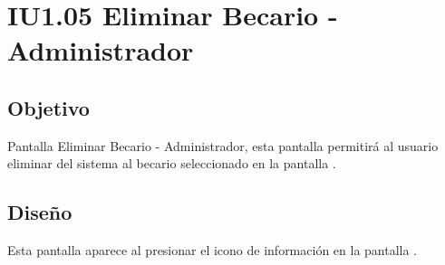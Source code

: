 \newpage
\section{IU1.05 Eliminar Becario - Administrador}

\subsection{Objetivo}
	Pantalla  Eliminar Becario - Administrador, esta pantalla permitirá al usuario  eliminar del sistema al becario seleccionado en la pantalla  .
	
	


\subsection{Diseño}
    Esta pantalla aparece al presionar el icono de información \faTrashO en la pantalla .

	
